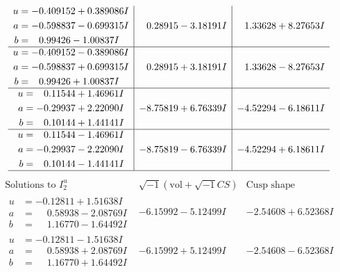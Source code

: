 \documentclass[1p]{elsarticle_modified}
\theoremstyle{definition}
\newcommand{\I}{\sqrt{-1}}
\begin{document}
$$\begin{array}{c|c|c}
\begin{aligned}
u &= -0.409152 + 0.389086 I \\
a &= -0.598837 - 0.699315 I \\
b &= \phantom{-}0.99426 - 1.00837 I\end{aligned}
 & \phantom{-}0.28915 - 3.18191 I & \phantom{-}1.33628 + 8.27653 I \\ \hline\begin{aligned}
u &= -0.409152 - 0.389086 I \\
a &= -0.598837 + 0.699315 I \\
b &= \phantom{-}0.99426 + 1.00837 I\end{aligned}
 & \phantom{-}0.28915 + 3.18191 I & \phantom{-}1.33628 - 8.27653 I \\ \hline\begin{aligned}
u &= \phantom{-}0.11544 + 1.46961 I \\
a &= -0.29937 + 2.22090 I \\
b &= \phantom{-}0.10144 + 1.44141 I\end{aligned}
 & -8.75819 + 6.76339 I & -4.52294 - 6.18611 I \\ \hline\begin{aligned}
u &= \phantom{-}0.11544 - 1.46961 I \\
a &= -0.29937 - 2.22090 I \\
b &= \phantom{-}0.10144 - 1.44141 I\end{aligned}
 & -8.75819 - 6.76339 I & -4.52294 + 6.18611 I\\
 \hline 
 \end{array}$$\newpage$$\begin{array}{c|c|c}  
\text{Solutions to }I^u_{2}& \I (\text{vol} + \sqrt{-1}CS) & \text{Cusp shape}\\
 \hline 
\begin{aligned}
u &= -0.12811 + 1.51638 I \\
a &= \phantom{-}0.58938 - 2.08769 I \\
b &= \phantom{-}1.16770 - 1.64492 I\end{aligned}
 & -6.15992 - 5.12499 I & -2.54608 + 6.52368 I \\ \hline\begin{aligned}
u &= -0.12811 - 1.51638 I \\
a &= \phantom{-}0.58938 + 2.08769 I \\
b &= \phantom{-}1.16770 + 1.64492 I\end{aligned}
 & -6.15992 + 5.12499 I & -2.54608 - 6.52368 I \\ \hline\begin{aligned}

\end{aligned}
\end{array}$$
\end{document}
